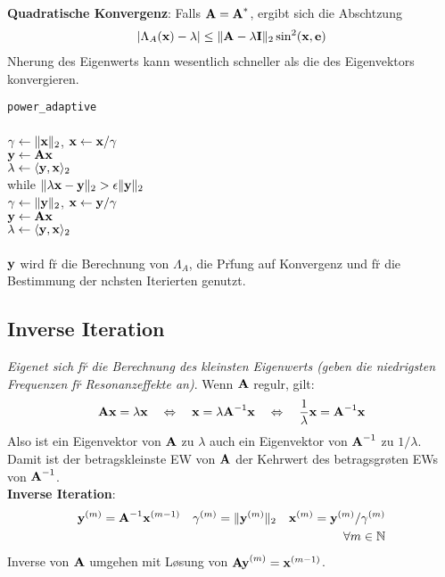 \textbf{Quadratische Konvergenz}: Falls $\mbox{\bf A}=\mbox{\bf A}^*$, ergibt sich die Absch\a tzung\begin{align*}
|\Lambda_A(\mbox{\bf x}) - \lambda| \leq \Vert \mbox{\bf A}- \lambda \mbox{\bf I} \Vert_2 \sin^2(\mbox{\bf x},\mbox{\bf e})
\end{align*}
N\a herung des Eigenwerts kann wesentlich schneller  als die des Eigenvektors konvergieren.\vspace{0.2cm}

\verb!power_adaptive!\\
{\addtolength{\leftskip}{0mm}
\hrulefill\\
$\gamma \leftarrow \Vert \mbox{\bf x} \Vert_2$, $\mbox{\bf x} \leftarrow \mbox{\bf x}/\gamma$ \\
$\mbox{\bf y} \leftarrow \mbox{\bf Ax}$\\
$\lambda \leftarrow \langle \mbox{\bf y},\mbox{\bf x} \rangle_2$\\
while $\Vert \lambda\mbox{\bf x} - \mbox{\bf y} \Vert_2 > \epsilon \Vert \mbox{\bf y} \Vert_2$ \\ 
\quad $\gamma \leftarrow \Vert \mbox{\bf y} \Vert_2$, $\mbox{\bf x} \leftarrow \mbox{\bf y}/\gamma$ \\
\quad $\mbox{\bf y} \leftarrow \mbox{\bf Ax}$\\
\quad $\lambda \leftarrow \langle \mbox{\bf y},\mbox{\bf x} \rangle_2$\\
\hrulefill\\
}
$\mbox{\bf y}$ wird f\u r die Berechnung von $\Lambda_A$, die Pr\u fung auf Konvergenz und f\u r die Bestimmung der n\a chsten Iterierten genutzt.

\subsection{Inverse Iteration}
\emph{Eigenet sich f\u r die Berechnung des kleinsten Eigenwerts (geben die niedrigsten Frequenzen f\u r Resonanzeffekte an)}.
Wenn $\mbox{\bf A}$ regul\a r, gilt:
\begin{align*}
\mbox{\bf Ax} = \lambda\mbox{\bf x} \quad\Leftrightarrow\quad \mbox{\bf x} = \lambda\mbox{\bf A}^{-1}\mbox{\bf x} \quad\Leftrightarrow\quad \frac{1}{\lambda}\mbox{\bf x} = \mbox{\bf A}^{-1}\mbox{\bf x}
\end{align*}
Also ist ein Eigenvektor von $\mbox{\bf A}$ zu $\lambda$ auch ein Eigenvektor von $\mbox{\bf A}^{-1}$ zu $1/\lambda$. Damit ist der betragskleinste EW von $\mbox{\bf A}$ der Kehrwert des betragsgr\o \s ten EWs von $\mbox{\bf A}^{-1}$.\\
\textbf{Inverse Iteration}:
\begin{align*}
\mbox{\bf y}^{(m)} = \mbox{\bf A}^{-1}\mbox{\bf x}^{(m-1)} \quad \gamma^{(m)} = \Vert \mbox{\bf y}^{(m)} \Vert_2 \quad \mbox{\bf x}^{(m)} = \mbox{\bf y}^{(m)}/\gamma^{(m)} \\ \forall m\in \mathbb{N}
\end{align*}
Inverse von $\mbox{\bf A}$ umgehen mit L\o sung von $\mbox{\bf Ay}^{(m)} = \mbox{\bf x}^{(m-1)}$.

